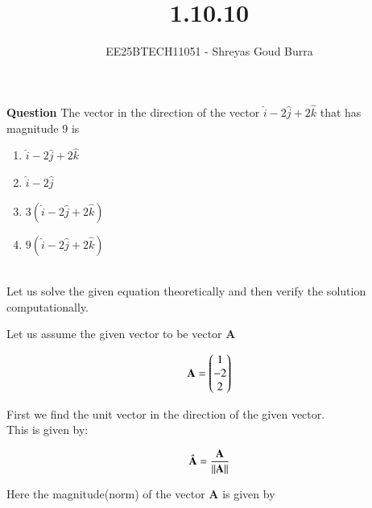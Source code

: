 \documentclass[journal]{IEEEtran}
\begin{document}

\vspace{3cm}

\title{1.10.10}
\author{EE25BTECH11051 - Shreyas Goud Burra}
\maketitle
{\let\newpage\relax\maketitle}

\renewcommand{\thefigure}{\theenumi}
\renewcommand{\thetable}{\theenumi}
\setlength{\intextsep}{10pt} %


\renewcommand{\thetable}{\theenumi}

\textbf{Question}
The vector in the direction of the vector $\hat{i} - 2\hat{j} + 2\hat{k}$ that has magnitude 9 is
\begin{enumerate}[label=(\alph*)]
    \item $\hat{i}-2\hat{j}+2\hat{k}$
    \item $\hat{i}-2\hat{j}$
    \item $3(\hat{i}-2\hat{j}+2\hat{k})$
    \item $9(\hat{i}-2\hat{j}+2\hat{k})$
\end{enumerate}

\solution \\

Let us solve the given equation theoretically and then verify the solution computationally.

Let us assume the given vector to be vector \textbf{A}

\begin{align}
    \textbf{A} = \begin{pmatrix}1 \\ -2 \\ 2\end{pmatrix}
    \label{4.1}
\end{align}

First we find the unit vector in the direction of the given vector.\\
This is given by:

\begin{align}
    \hat{\textbf{A}} = \frac{\textbf{A}}{\left\lVert\textbf{A}\right\rVert}
    \label{4.2}
\end{align}

Here the magnitude(norm) of the vector \textbf{A} is given by
\end{document}
